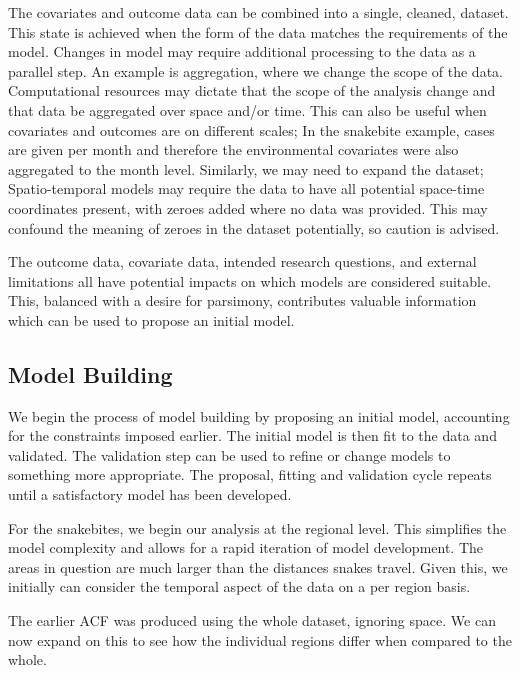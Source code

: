 \documentclass{article}
\begin{document}
The covariates and outcome data can be combined into a single, cleaned, dataset. This state is achieved when the form of the data matches the requirements of the model. Changes in model may require additional processing to the data as a parallel step.
An example is aggregation, where we change the scope of the data. Computational resources may dictate that the scope of the analysis change and that data be aggregated over space and/or time. This can also be useful when covariates and outcomes are on different scales; In the snakebite example, cases are given per month and therefore the environmental covariates were also aggregated to the month level. Similarly, we may need to expand the dataset; Spatio-temporal models may require the data to have all potential space-time coordinates present, with zeroes added where no data was provided. This may confound the meaning of zeroes in the dataset potentially, so caution is advised.

The outcome data, covariate data, intended research questions, and external limitations all have potential impacts on which models are considered suitable. This, balanced with a desire for parsimony, contributes valuable information which can be used to propose an initial model.

\subsection{Model Building}

We begin the process of model building by proposing an initial model, accounting for the constraints imposed earlier. The initial model is then fit to the data and validated. The validation step can be used to refine or change models to something more appropriate. The proposal, fitting and validation cycle repeats until a satisfactory model has been developed.

For the snakebites, we begin our analysis at the regional level. This simplifies the model complexity and allows for a rapid iteration of model development. The areas in question are much larger than the distances snakes travel. Given this, we initially can consider the temporal aspect of the data on a per region basis. 

The earlier ACF was produced using the whole dataset, ignoring space. We can now expand on this to see how the individual regions differ when compared to the whole.
\end{document}
